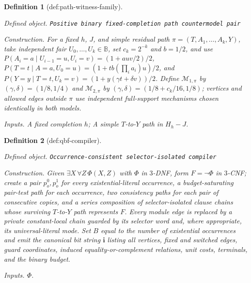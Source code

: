 \documentclass{article}
\newtheorem{definition}{Definition}
\begin{document}
\begin{definition}[def:path-witness-family]\label{def:path-witness-family}
\par\smallskip\noindent\emph{Defined object.} \texttt{Positive binary fixed-\allowbreak{}completion path countermodel pair}
\par\smallskip\noindent\emph{Construction.} For a fixed \(h\), \(J\), and simple residual path \(\pi=(T,A_1,\ldots,A_k,Y)\), take independent fair \(U_0,\ldots,U_k\in\mathbb B\), set \(c_k=2^{-k}\) and \(b=1/2\), and use \(P(A_i=a\mid U_{i-1}=u,U_i=v)=(1+auv/2)/2\), \(P(T=t\mid A=a,U_0=u)=(1+tb(\prod_i a_i)u)/2\), and \(P(Y=y\mid T=t,U_k=v)=(1+y(\gamma t+\delta v))/2\). Define \(\mathcal M_{1,\pi}\) by \((\gamma,\delta)=(1/8,1/4)\) and \(\mathcal M_{2,\pi}\) by \((\gamma,\delta)=(1/8+c_k/16,1/8)\); vertices and allowed edges outside \(\pi\) use independent full-support mechanisms chosen identically in both models.
\par\smallskip\noindent\emph{Inputs.} A fixed completion \(h\); A simple \(T\)-to-\(Y\) path in \(H_h-J\).
\end{definition}

\begin{definition}[def:qbf-compiler]\label{def:qbf-compiler}
\par\smallskip\noindent\emph{Defined object.} \texttt{Occurrence-\allowbreak{}consistent selector-\allowbreak{}isolated compiler}
\par\smallskip\noindent\emph{Construction.} Given \(\exists X\,\forall Z\,\Phi(X,Z)\) with \(\Phi\) in \(3\)-DNF, form \(F=\neg\Phi\) in \(3\)-CNF; create a pair \(p_o^0,p_o^1\) for every existential-literal occurrence, a budget-saturating pair-test path for each occurrence, two consistency paths for each pair of consecutive copies, and a series composition of selector-isolated clause chains whose surviving \(T\)-to-\(Y\) path represents \(F\). Every module edge is replaced by a private constant-local chain guarded by its selector word and, where appropriate, its universal-literal mode. Set \(B\) equal to the number of existential occurrences and emit the canonical bit string \(\mathbf i\) listing all vertices, fixed and switched edges, guard coordinates, induced equality-or-complement relations, unit costs, terminals, and the binary budget.
\par\smallskip\noindent\emph{Inputs.} \(\Phi\).
\end{definition}
\end{document}
